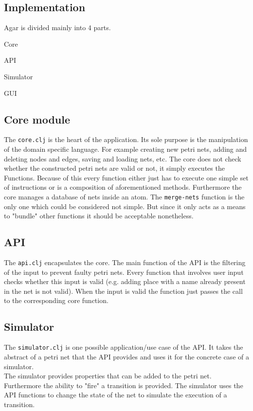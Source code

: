 \documentclass[twoside]{article}
\begin{document}
\begin{multicols}{2}
\section{Implementation}

Agar is divided mainly into 4 parts. 
\begin{compactitem}
\item Core
\item API
\item Simulator 
\item GUI
\end{compactitem}
\subsection{Core module}
The \texttt{core.clj} is the heart of the application. Its sole purpose is the manipulation of the
domain specific language. For example creating new petri nets, adding and deleting nodes and edges,
saving and loading nets, etc.
The core does not check whether the constructed petri nets are valid or not, it simply executes the Functions.
Because of this every function either just has to execute one simple set of instructions or is a composition of
aforementioned methods.
Furthermore the core manages a database of nets inside an atom. 
The \texttt{merge-nets} function is the only one which could be considered not simple. But since it only
acts as a means to "bundle" other functions it should be acceptable nonetheless.

\subsection{API}
The \texttt{api.clj} encapsulates the core. The main function of the API is the filtering of the
input to prevent faulty petri nets. Every function that involves user input checks whether this 
input is valid (e.g. adding  place with a name already present in the net is not valid). When the input 
is valid the function just passes the call to the corresponding core function.

\subsection{Simulator}
The \texttt{simulator.clj} is one possible application/use case of the API.
It takes the abstract of a petri net that the API provides and uses it for the
concrete case of a simulator. \\
The simulator provides properties that can be added to the petri net. Furthermore
the ability to "fire" a transition is provided. The simulator uses the API functions to
change the state of the net to simulate the execution of a transition.


\end{multicols}
\end{document}
